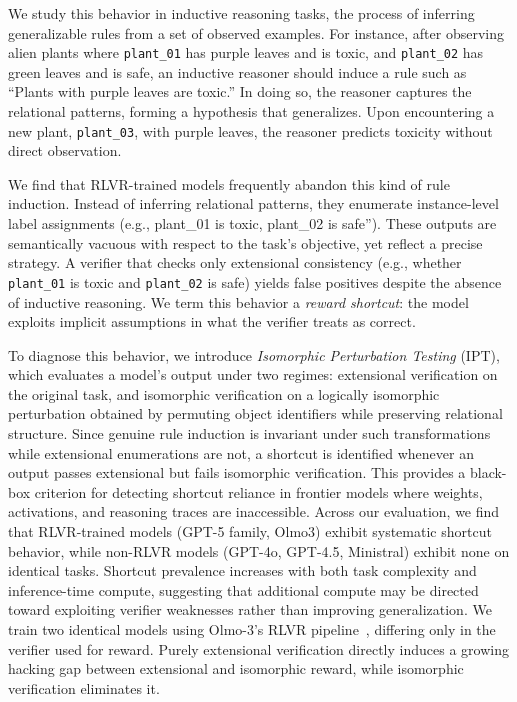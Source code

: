 \documentclass{article}
\newcommand{\symbols}[1]{\texttt{\small{#1}}}
\begin{document}
We study this behavior in inductive reasoning tasks, the process of inferring generalizable rules from a set of observed examples. For instance, after observing alien plants where \symbols{plant\_01} has purple leaves and is toxic, and \symbols{plant\_02} has green leaves and is safe, an inductive reasoner should induce a rule such as “Plants with purple leaves are toxic.” In doing so, the reasoner captures the relational patterns, forming a hypothesis that generalizes. Upon encountering a new plant, \symbols{plant\_03}, with purple leaves, the reasoner predicts toxicity without direct observation.

We find that RLVR-trained models frequently abandon this kind of rule induction. Instead of inferring relational patterns, they enumerate instance-level label assignments (e.g., plant\_01 is toxic, plant\_02 is safe''). These outputs are semantically vacuous with respect to the task's objective, yet reflect a precise strategy. A verifier that checks only extensional consistency (e.g., whether \symbols{plant\_01} is toxic and \symbols{plant\_02} is safe) yields false positives despite the absence of inductive reasoning. We term this behavior a \textit{reward shortcut}: the model exploits implicit assumptions in what the verifier treats as correct.  



To diagnose this behavior, we introduce \textit{Isomorphic Perturbation Testing} (IPT), which evaluates a model's output under two regimes: extensional verification on the original task, and isomorphic verification on a logically isomorphic perturbation obtained by permuting object identifiers while preserving relational structure. Since genuine rule induction is invariant under such transformations while extensional enumerations are not, a shortcut is identified whenever an output passes extensional but fails isomorphic verification. This provides a black-box criterion for detecting shortcut reliance in frontier models where weights, activations, and reasoning traces are inaccessible.
%
Across our evaluation, we find that RLVR-trained models (GPT-5 family, Olmo3) exhibit systematic shortcut behavior, while non-RLVR models (GPT-4o, GPT-4.5, Ministral) exhibit none on identical tasks. Shortcut prevalence increases with both task complexity and inference-time compute, suggesting that additional compute may be directed toward exploiting verifier weaknesses rather than improving generalization. We train two identical models using Olmo-3's RLVR pipeline~\cite{olmo2025olmo3}, differing only in the verifier used for reward. Purely extensional verification directly induces a growing hacking gap between extensional and isomorphic reward, while isomorphic verification eliminates it.
\end{document}
